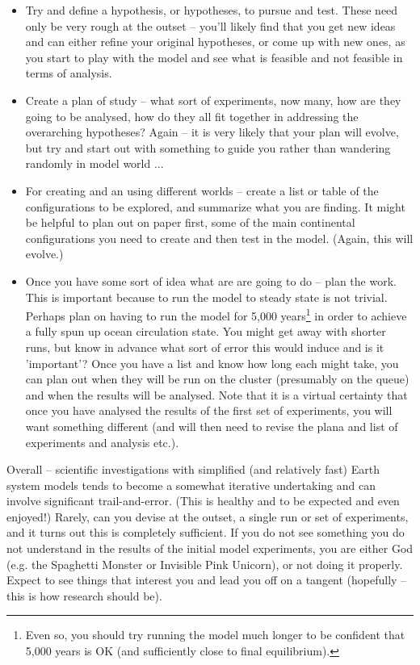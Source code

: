\documentclass[11pt,fleqn]{book} %
\begin{document}
\vspace{2mm}
\begin{itemize}[noitemsep]
\vspace{1mm}
\item Try and define a hypothesis, or hypotheses, to pursue and test. These need only be very rough at the outset -- you'll likely find that you get new ideas and can either refine your original hypotheses, or come up with new ones, as you start to play with the model and see what is feasible and not feasible in terms of analysis.
\vspace{1mm}
\item Create a plan of study -- what sort of experiments, now many, how are they going to be analysed, how do they all fit together in addressing the overarching hypotheses? Again -- it is very likely that your plan will evolve, but try and start out with something to guide you rather than wandering randomly in model world ...
\vspace{1mm}
\item For creating and an using different worlds -- create a list or table of the configurations to be explored, and summarize what you are finding. It might be helpful to plan out on paper first, some of the main continental configurations you need to create and then test in the model. (Again, this will evolve.)
\vspace{1mm}
\item Once you have some sort of idea what are are going to do -- plan the work. This is important because to run the model to steady state is not trivial. Perhaps plan on having to run the model for 5,000 years\footnote{Even so, you should try running the model much longer to be confident that 5,000 years is OK (and sufficiently close to final equilibrium).} in order to achieve a fully spun up ocean circulation state. You might get away with shorter runs, but know in advance what sort of error this would induce and is it 'important'? Once you have a list and know how long each might take, you can plan out when they will be run on the cluster (presumably on the queue) and when the results will be analysed. Note that it is a virtual certainty that once you have analysed the results of the first set of experiments, you will want something different (and will then need to revise the plana and list of experiments and analysis etc.).
\end{itemize}
\vspace{2mm}

\noindent Overall -- scientific investigations with simplified (and relatively fast) Earth system models tends to become a somewhat iterative undertaking and can involve significant trail-and-error. (This is healthy and to be expected and even enjoyed!) Rarely, can you devise at the outset, a single run or set of experiments, and it turns out this is completely sufficient. If you do not see something you do not understand in the results of the initial model experiments, you are either God (e.g. the Spaghetti Monster or Invisible Pink Unicorn), or not doing it properly. Expect to see things that interest you and lead you off on a tangent (hopefully -- this is how research should be).
\end{document}
